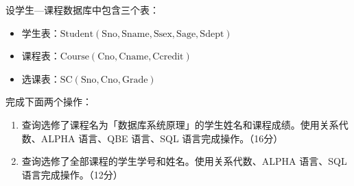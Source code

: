 \documentclass[UTF8]{ctexart}
\begin{document}
{\color{darkcyan}
设学生—课程数据库中包含三个表：
\begin{itemize}[itemsep=0pt,parsep=0pt]
    \item 学生表：$\mathrm{Student(Sno, Sname, Ssex, Sage, Sdept)}$
    \item 课程表：$\mathrm{Course(Cno, Cname, Ccredit)}$
    \item 选课表：$\mathrm{SC(Sno, Cno, Grade)}$
\end{itemize}
完成下面两个操作：
\begin{enumerate}
    \item 查询选修了课程名为「数据库系统原理」的学生姓名和课程成绩。使用关系代数、ALPHA 语言、QBE 语言、SQL 语言完成操作。（16分）
    \item 查询选修了全部课程的学生学号和姓名。使用关系代数、ALPHA 语言、SQL 语言完成操作。（12分）
\end{enumerate}
}
\end{document}

